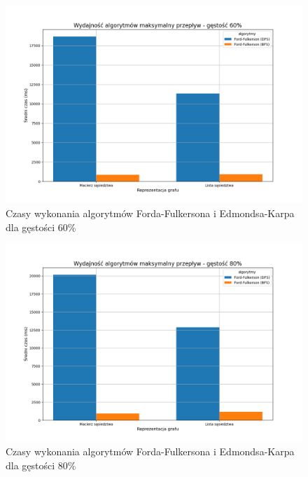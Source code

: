 \documentclass{article}
\begin{document}
\begin{figure}[H]
    \centering
    \includegraphics[scale=0.5]{../Python/charts_type2/Typ2_MAX_FLOW_gestosc60_wykres.png}
    \caption{Czasy wykonania algorytmów Forda-Fulkersona i Edmondsa-Karpa dla gęstości 60\%}
\end{figure}

\begin{figure}[H]
    \centering
    \includegraphics[scale=0.5]{../Python/charts_type2/Typ2_MAX_FLOW_gestosc80_wykres.png}
    \caption{Czasy wykonania algorytmów Forda-Fulkersona i Edmondsa-Karpa dla gęstości 80\%}
\end{figure}
\end{document}

